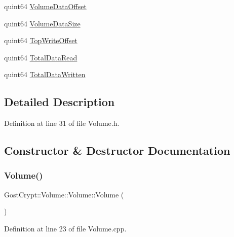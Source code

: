 \begin{DoxyCompactItemize}
quint64 \hyperlink{class_gost_crypt_1_1_volume_1_1_volume_a9101fb0edf9024a9ee42620ea972148f}{Volume\+Data\+Offset}
\item 
quint64 \hyperlink{class_gost_crypt_1_1_volume_1_1_volume_a1400299fb764cefa747527af4dbcab79}{Volume\+Data\+Size}
\item 
quint64 \hyperlink{class_gost_crypt_1_1_volume_1_1_volume_a6c1820e321592d58862005f841870e64}{Top\+Write\+Offset}
\item 
quint64 \hyperlink{class_gost_crypt_1_1_volume_1_1_volume_a3f9836f68d9e4e157f1f38e349d18ff9}{Total\+Data\+Read}
\item 
quint64 \hyperlink{class_gost_crypt_1_1_volume_1_1_volume_ab70cd1d4d343b26f0311d5a0b7d1a4d5}{Total\+Data\+Written}
\end{DoxyCompactItemize}


\subsection{Detailed Description}


Definition at line 31 of file Volume.\+h.



\subsection{Constructor \& Destructor Documentation}
\mbox{\label{class_gost_crypt_1_1_volume_1_1_volume_a72438765771032734c06a4654a7cfc9c}} 
\subsubsection{\texorpdfstring{Volume()}{Volume()}}
{\footnotesize\ttfamily Gost\+Crypt\+::\+Volume\+::\+Volume\+::\+Volume (\begin{DoxyParamCaption}{ }\end{DoxyParamCaption})}



Definition at line 23 of file Volume.\+cpp.

\mbox{\label{class_gost_crypt_1_1_volume_1_1_volume_a295a4d4c55ba8407cf2b894bdf958ef3}} 
